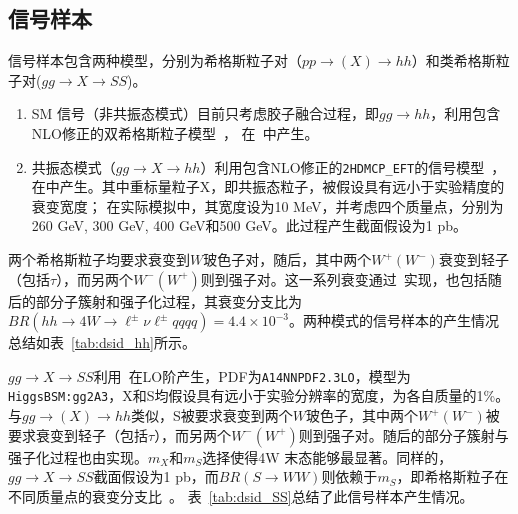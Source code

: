 \subsection{信号样本}
信号样本包含两种模型，分别为希格斯粒子对（$pp\rightarrow (X) \rightarrow hh$）和类希格斯粒子对($gg \rightarrow X \rightarrow SS$)。
\begin{enumerate}
    \item SM 信号（非共振态模式）目前只考虑胶子融合过程，即$gg\rightarrow hh$，利用包含NLO修正的双希格斯粒子模型~\cite{Frederix:2014hta}，
    在\MGMCatNLO~\cite{madgraph5amcnlo,syscalc}中产生。
    \item 共振态模式（$gg\rightarrow X\rightarrow  hh$）利用包含NLO修正的\texttt{2HDMCP\_EFT}的信号模型~\cite{MG5-HH-LO}，在\MGMCatNLO 中产生。其中重标量粒子X，即共振态粒子，被假设具有远小于实验精度的衰变宽度；
在实际模拟中，其宽度设为10 MeV，并考虑四个质量点，分别为260 GeV, 300 GeV, 400 GeV和500 GeV。此过程产生截面假设为1 pb。 
\end{enumerate}
两个希格斯粒子均要求衰变到$W$玻色子对，随后，其中两个$W^{+}(W^{-})$衰变到轻子（包括$\tau$），而另两个$W^{-}(W^{+})$则到强子对。这一系列衰变通过\Herwigpp~\cite{herwigpp}实现，也包括随后的部分子簇射和强子化过程，其衰变分支比为$BR(hh\rightarrow 4W \rightarrow \ell^{\pm}\nu\ell^{\pm}qqqq)=4.4\times10^{-3}$。两种模式的信号样本的产生情况总结如表~\ref{tab:dsid_hh}所示。


$gg \rightarrow X \rightarrow SS$利用~\cite{pythia8}在LO阶产生，PDF为\texttt{A14NNPDF2.3LO}，模型为\texttt{HiggsBSM:gg2A3}，X和S均假设具有远小于实验分辨率的宽度，为各自质量的1\%。与$gg\rightarrow (X) \rightarrow hh$类似，S被要求衰变到两个$W$玻色子，其中两个$W^{+}(W^{-})$被要求衰变到轻子（包括$\tau$），而另两个$W^{-}(W^{+})$则到强子对。随后的部分子簇射与强子化过程也由实现。$m_X$和$m_S$选择使得4W 末态能够最显著。同样的，$gg \rightarrow X \rightarrow SS$截面假设为1 pb，而$BR(S\rightarrow WW)$则依赖于$m_S$，即希格斯粒子在不同质量点的衰变分支比~\cite{Denner:2011mq}。
表~\ref{tab:dsid_SS}总结了此信号样本产生情况。


